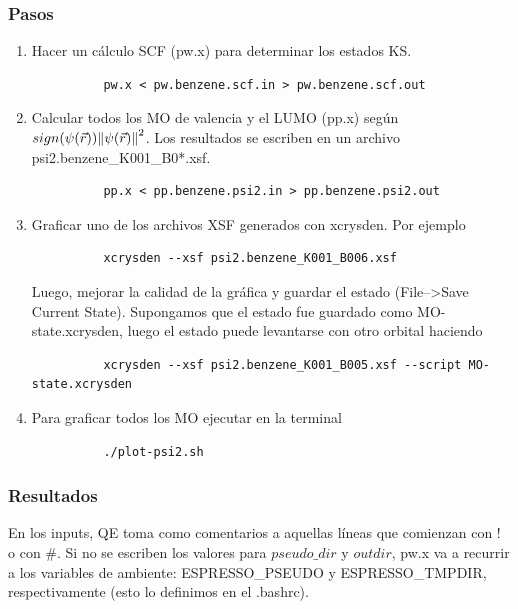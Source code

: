 \subsubsection{Pasos}
    \begin{enumerate}
      \item Hacer un cálculo SCF (pw.x) para determinar los estados KS.
        \begin{verbatim}
          pw.x < pw.benzene.scf.in > pw.benzene.scf.out
        \end{verbatim}
      \item Calcular todos los MO de valencia y el LUMO (pp.x) según $sign(\psi (\vec{r})) \norm{\psi (\vec{r})}^2$. Los resultados se escriben en un archivo psi2.benzene\_K001\_B0*.xsf.
        \begin{verbatim}
          pp.x < pp.benzene.psi2.in > pp.benzene.psi2.out
        \end{verbatim}
      \item Graficar uno de los archivos XSF generados con xcrysden. Por ejemplo
        \begin{verbatim}
          xcrysden --xsf psi2.benzene_K001_B006.xsf
        \end{verbatim}

            Luego, mejorar la calidad de la gráfica y guardar el estado (File-->Save Current State). Supongamos que el estado fue guardado como MO-state.xcrysden, luego el estado puede levantarse con otro orbital haciendo
        \begin{verbatim}
          xcrysden --xsf psi2.benzene_K001_B005.xsf --script MO-state.xcrysden
        \end{verbatim}
      \item Para graficar todos los MO ejecutar en la terminal
        \begin{verbatim}
          ./plot-psi2.sh
        \end{verbatim}
    \end{enumerate}

\subsubsection{Resultados}

  En los inputs, QE toma como comentarios a aquellas líneas que comienzan con ! o con \#. Si no se escriben los valores para $pseudo\_dir$ y $outdir$, pw.x va a recurrir a los variables de ambiente: ESPRESSO\_PSEUDO y ESPRESSO\_TMPDIR, respectivamente (esto lo definimos en el .bashrc).

